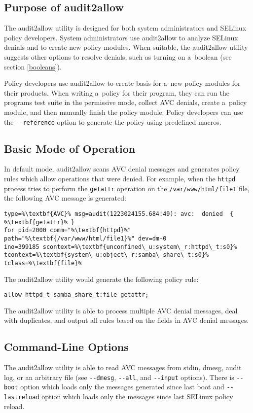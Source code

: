 \subsection{Purpose of audit2allow}
The audit2allow utility is designed for both system administrators and SELinux
policy developers. System administrators use audit2allow to analyze SELinux
denials and to create new policy modules. When suitable, the audit2allow utility
suggests other options to resolve denials, such as turning on a~boolean (see
section \ref{booleans}).

Policy developers use audit2allow to create basis for a~new policy modules for
their products. When writing a~policy for their program, they can run the
programs test suite in the permissive mode, collect AVC denials, create a~policy
module, and then manually finish the policy module. Policy developers can use
the \texttt{-{}-reference} option to generate the policy using predefined
macros.

\subsection{Basic Mode of Operation}
In default mode, audit2allow scans AVC denial messages and generates policy
rules which allow operations that were denied. For example, when the
\texttt{httpd} process tries to perform the \texttt{getattr} operation on the
\texttt{/var/www/html/file1} file, the following AVC message is generated:
\begin{lstlisting}[escapechar=\%]
type=%\textbf{AVC}% msg=audit(1223024155.684:49): avc:  denied  { %\textbf{getattr}% }
for pid=2000 comm="%\textbf{httpd}%" path="%\textbf{/var/www/html/file1}%" dev=dm-0
ino=399185 scontext=%\textbf{unconfined\_u:system\_r:httpd\_t:s0}%
tcontext=%\textbf{system\_u:object\_r:samba\_share\_t:s0}% tclass=%\textbf{file}%
\end{lstlisting}
The audit2allow utility would generate the following policy rule:
\begin{lstlisting}
allow httpd_t samba_share_t:file getattr;
\end{lstlisting}
The audit2allow utility is able to process multiple AVC denial messages, deal
with duplicates, and output all rules based on the fields in AVC denial
messages.

\subsection{Command-Line Options}
The audit2allow utility is able to read AVC messages from stdin, dmesg, audit
log, or an arbitrary file (see \texttt{-{}-dmesg}, \texttt{-{}-all}, and
\texttt{-{}-input} options). There is \texttt{-{}-boot} option which loads only
the messages generated since last boot and \texttt{-{}-lastreload} option which
loads only the messages since last SELinux policy reload.


